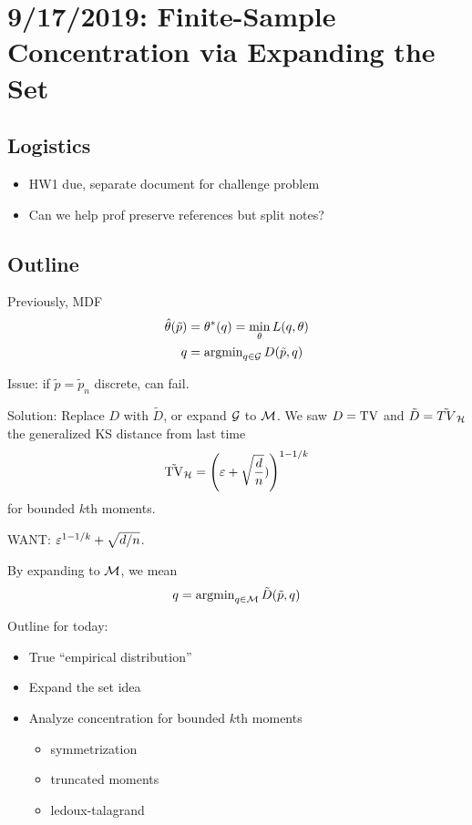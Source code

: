 \section{9/17/2019: Finite-Sample Concentration via Expanding the Set}

\subsection{Logistics}

\begin{itemize}
  \item HW1 due, separate document for challenge problem
  \item Can we help prof preserve references but split notes?
\end{itemize}

\subsection{Outline}

Previously, MDF
\begin{align}
  \hat\theta(\tilde{p}) &= \theta^*(q) = \min_\theta L(q,\theta) \\
  q &= \operatorname{argmin}_{q \in \mathcal{G}} D(\tilde{p}, q)
\end{align}

Issue: if $\tilde{p} = \tilde{p}_n$ discrete, can fail.

Solution: Replace $D$ with $\tilde{D}$, or expand $\mathcal{G}$ to $\mathcal{M}$.
We saw $D = \operatorname{TV}$ and $\tilde{D} = \tilde{TV}_{\mathcal{H}}$ the generalized KS distance
from last time
\begin{align}
  \tilde{\operatorname{TV}}_{\mathcal{H}} = \left(\varepsilon + \sqrt{\frac{d}{n}})\right)^{1 - 1/k}
\end{align}
for bounded $k$th moments.

WANT: $\varepsilon^{1 - 1/k} + \sqrt{d/n}$.

By expanding to $\mathcal{M}$, we mean
\begin{align}
  q = \operatorname{argmin}_{q \in \mathcal{M}} \tilde{D}(\tilde{p}, q)
\end{align}

Outline for today:
\begin{itemize}
  \item True ``empirical distribution''
  \item Expand the set idea
  \item Analyze concentration for bounded $k$th moments
    \begin{itemize}
      \item symmetrization
      \item truncated moments
      \item ledoux-talagrand
    \end{itemize}
\end{itemize}

